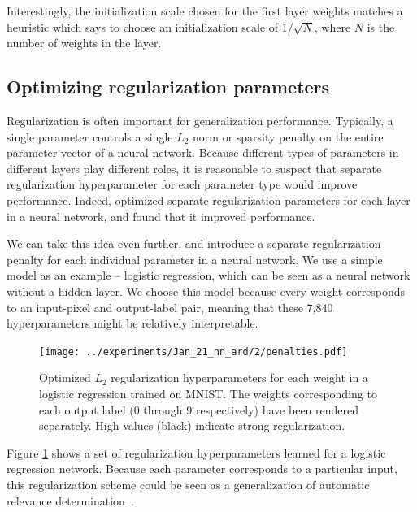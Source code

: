 \documentclass{article}
\begin{document}
Interestingly, the initialization scale chosen for the first layer weights matches a heuristic which says to choose an initialization scale of $1/\sqrt{N}$, where $N$ is the number of weights in the layer.

\subsection{Optimizing regularization parameters}
\label{sec:optimizing regularization}
Regularization is often important for generalization performance.
Typically, a single parameter controls a single $L_2$ norm or sparsity penalty on the entire parameter vector of a neural network.
Because different types of parameters in different layers play different roles, it is reasonable to suspect that separate regularization hyperparameter for each parameter type would improve performance.
Indeed, \citet{snoek2012practical} optimized separate regularization parameters for each layer in a neural network, and found that it improved performance.

We can take this idea even further, and introduce a separate regularization penalty for each individual parameter in a neural network.
We use a simple model as an example -- logistic regression, which can be seen as a neural network without a hidden layer.
We choose this model because every weight corresponds to an input-pixel and output-label pair, meaning that these 7,840 hyperparameters might be relatively interpretable.
%
\begin{figure}[t]
\begin{center}
\texttt{[image: ../experiments/Jan\_21\_nn\_ard/2/penalties.pdf]}
\vspace{-2em}
\caption{Optimized $L_2$ regularization hyperparameters for each weight in a logistic regression  trained on MNIST.
The weights corresponding to each output label (0 through 9 respectively) have been rendered separately.
High values (black) indicate strong regularization.}%
\label{fig:logistic ard}%
\end{center}
\vskip -0.15in
\end{figure} 
%
Figure \ref{fig:logistic ard} shows a set of regularization hyperparameters learned for a logistic regression network.
Because each parameter corresponds to a particular input, this regularization scheme could be seen as a generalization of automatic relevance determination~\citep{mackay1994automatic}.
\end{document}
